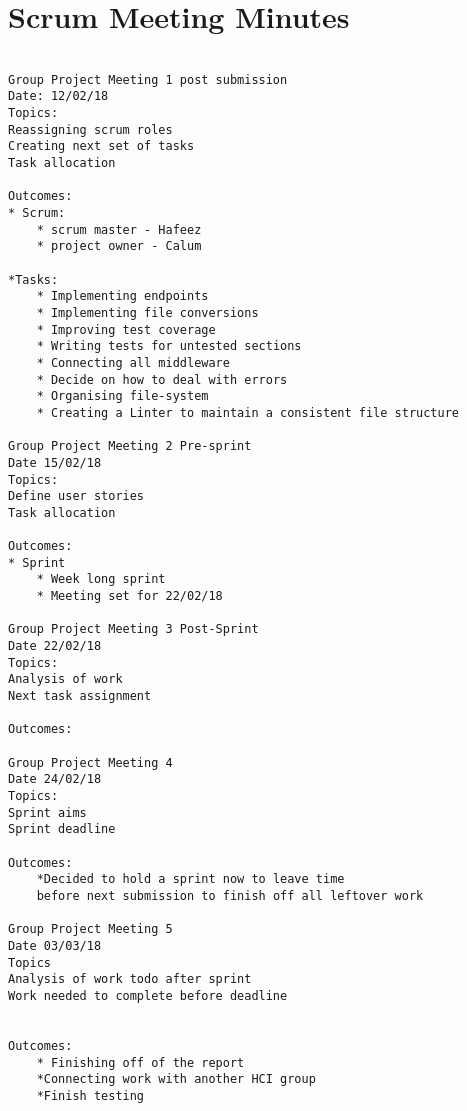
\section{Scrum Meeting Minutes} \label{app:meet}

\begin{lstlisting} 

Group Project Meeting 1 post submission
Date: 12/02/18 
Topics: 
Reassigning scrum roles 
Creating next set of tasks 
Task allocation 

Outcomes:
* Scrum: 
    * scrum master - Hafeez 
    * project owner - Calum 

*Tasks:
    * Implementing endpoints
    * Implementing file conversions 
    * Improving test coverage 
    * Writing tests for untested sections 
    * Connecting all middleware 
    * Decide on how to deal with errors
    * Organising file-system 
    * Creating a Linter to maintain a consistent file structure 
    
Group Project Meeting 2 Pre-sprint
Date 15/02/18
Topics:
Define user stories
Task allocation 

Outcomes:
* Sprint
    * Week long sprint 
    * Meeting set for 22/02/18
    
Group Project Meeting 3 Post-Sprint
Date 22/02/18
Topics:
Analysis of work 
Next task assignment

Outcomes:

Group Project Meeting 4
Date 24/02/18
Topics: 
Sprint aims
Sprint deadline

Outcomes:
    *Decided to hold a sprint now to leave time 
    before next submission to finish off all leftover work

Group Project Meeting 5
Date 03/03/18 
Topics 
Analysis of work todo after sprint
Work needed to complete before deadline


Outcomes: 
    * Finishing off of the report 
    *Connecting work with another HCI group 
    *Finish testing 




    
    
    
\end{lstlisting}
